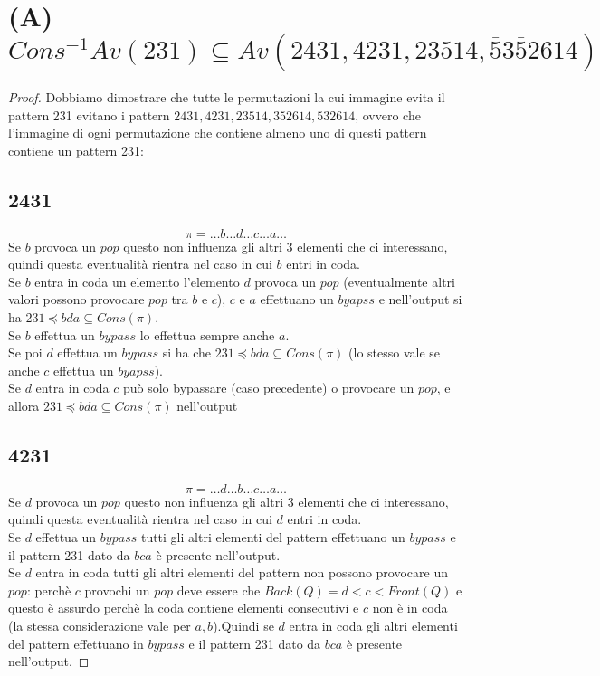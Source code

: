 \documentclass[10pt,a4paper]{article}
\begin{document}
\section*{(A) $Cons^{-1}Av(231) \subseteq Av(2431, 4231, 23514, \overline{5}3\overline{5}2614)$}
\begin{proof}
Dobbiamo dimostrare che tutte le permutazioni la cui immagine evita il pattern 231 evitano i pattern $2431, 4231, 23514, 3\overline{5}2614, \overline{5}32614$, ovvero che l'immagine di ogni permutazione che contiene almeno uno di questi pattern contiene un pattern 231:
\subsection*{2431}
$$\pi = \dots{b}\dots{d}\dots{c}\dots{a}\dots$$
Se $b$ provoca un $pop$ questo non influenza gli altri 3 elementi che ci interessano, quindi questa eventualità rientra nel caso in cui $b$ entri in coda.\\Se $b$ entra in coda un elemento l'elemento $d$ provoca un $pop$ (eventualmente altri valori possono provocare $pop$ tra $b$ e $c$), $c$ e $a$ effettuano un $byapss$ e nell'output si ha $231\preceq{bda}\subseteq{Cons(\pi)}$.\\
Se $b$ effettua un $bypass$ lo effettua sempre anche $a$.\\
Se poi $d$ effettua un $bypass$ si ha che $231\preceq{bda}\subseteq{Cons(\pi)}$ (lo stesso vale se anche $c$ effettua un $byapss$).\\
Se $d$ entra in coda $c$ può solo bypassare (caso precedente) o provocare un $pop$, e allora $231\preceq{bda}\subseteq{Cons(\pi)}$ nell'output
\subsection*{4231}
$$\pi = \dots{d}\dots{b}\dots{c}\dots{a}\dots$$
Se $d$ provoca un $pop$ questo non influenza gli altri 3 elementi che ci interessano, quindi questa eventualità rientra nel caso in cui $d$ entri in coda.\\
Se $d$ effettua un $bypass$ tutti gli altri elementi del pattern effettuano un $bypass$ e il pattern 231 dato da $bca$ è presente nell'output.\\
Se $d$ entra in coda tutti gli altri elementi del pattern non possono provocare un $pop$: perchè $c$ provochi un $pop$ deve essere che $Back(Q)=d<c<Front(Q)$ e questo è assurdo perchè la coda contiene elementi consecutivi e $c$ non è in coda (la stessa considerazione vale per $a,b$).Quindi se $d$ entra in coda gli altri elementi del pattern effettuano in $bypass$ e il pattern 231 dato da $bca$ è presente nell'output.

\end{proof}
\end{document}
